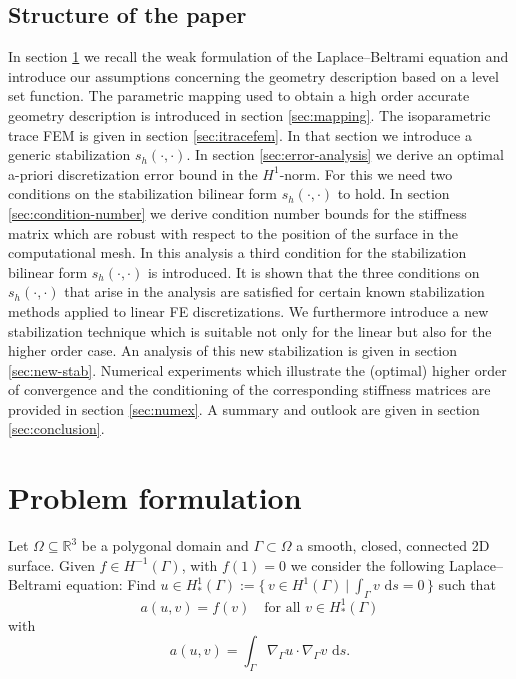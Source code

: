 \documentclass[final]{siamltex}
\begin{document}
\subsection*{Structure of the paper}
In section \ref{sec:problem} we recall the weak formulation of the Laplace--Beltrami equation and introduce our assumptions concerning the geometry description based on a level set function. The parametric mapping used to obtain a high order accurate geometry description is introduced in section 
\ref{sec:mapping}. The isoparametric trace FEM is given in section \ref{sec:itracefem}. In that section we introduce a generic stabilization $s_h(\cdot,\cdot)$. In section \ref{sec:error-analysis}
we derive an optimal a-priori discretization error bound in the $H^1$-norm. For this we need two conditions on the stabilization bilinear form $s_h(\cdot,\cdot)$ to hold. 
In section \ref{sec:condition-number} we derive condition number bounds for the stiffness matrix which are robust with respect to the
position of the surface in the computational mesh. In this analysis a third condition for the stabilization bilinear form $s_h(\cdot,\cdot)$ is introduced. It is shown that the three conditions on $s_h(\cdot,\cdot)$ that arise in the analysis are satisfied for certain known stabilization methods applied to linear FE discretizations. We furthermore introduce a new stabilization technique which is suitable not only for the linear but also for the higher order case. 
An analysis of this new stabilization is given in section \ref{sec:new-stab}. 
 Numerical experiments which illustrate the (optimal) higher order of convergence and the conditioning of the corresponding stiffness matrices are provided in section \ref{sec:numex}. A summary and outlook are given in section \ref{sec:conclusion}.

\section{Problem formulation} \label{sec:problem}
Let $\Omega\subseteq{\mathbb{R}}^3$
be a polygonal domain and $\Gamma \subset \Omega $ a smooth, closed, connected 2D surface.
Given $f\in H^{-1}(\Gamma)$, with $f(1)=0$ we consider the following Laplace--Beltrami equation:
Find $u\in H_\ast^1(\Gamma):= \{\, v \in H^1(\Gamma)~|~\int_\Gamma v \, {\,\mathrm{d} {s}}=0 \, \}$ such that
\begin{equation}\label{eq:weak-LB}
  a(u,v)= f(v)\quad\text{for all } v\in H_\ast^1(\Gamma)
\end{equation}
with
\[
  a(u,v)= \int_\Gamma \nabla_\Gamma u \cdot \nabla_\Gamma v \, {\,\mathrm{d} {s}}.
\]
\end{document}
